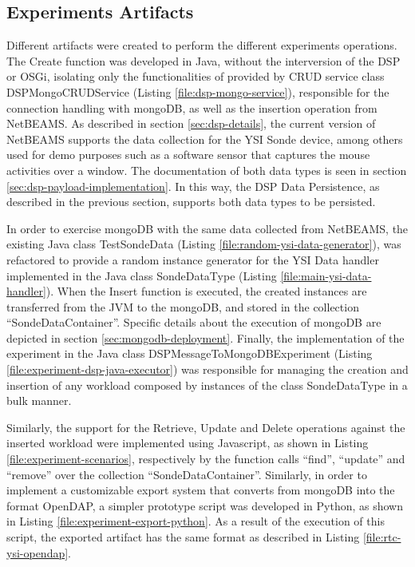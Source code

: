 \subsection{Experiments Artifacts}

Different artifacts were created to perform the different experiments
operations. The Create function was developed in Java, without the interversion
of the DSP or OSGi, isolating only the functionalities of provided by CRUD
service class DSPMongoCRUDService (Listing \ref{file:dsp-mongo-service}),
responsible for the connection handling with mongoDB, as well as the insertion
operation from NetBEAMS. As described in section \ref{sec:dsp-details}, the
current version of NetBEAMS supports the data collection for the YSI Sonde
device, among others used for demo purposes such as a software sensor that
captures the mouse activities over a window. The documentation of both data
types is seen in section \ref{sec:dsp-payload-implementation}. In this way, the
DSP Data Persistence, as described in the previous section, supports both data
types to be persisted.

In order to exercise mongoDB with the same data collected from NetBEAMS, the
existing Java class TestSondeData (Listing
\ref{file:random-ysi-data-generator}), was refactored to provide a random
instance generator for the YSI Data handler implemented in the Java class
SondeDataType (Listing \ref{file:main-ysi-data-handler}). When the Insert
function is executed, the created instances are transferred from the JVM to
the mongoDB, and stored in the collection ``SondeDataContainer''. Specific
details about the execution of mongoDB are depicted in section
\ref{sec:mongodb-deployment}. Finally, the implementation of the experiment
in the Java class DSPMessageToMongoDBExperiment (Listing
\ref{file:experiment-dsp-java-executor}) was responsible for managing the
creation and insertion of any workload composed by instances of the class
SondeDataType in a bulk manner.

Similarly, the support for the Retrieve, Update and Delete operations against
the inserted workload were implemented using Javascript, as shown in Listing
\ref{file:experiment-scenarios}, respectively by the function calls ``find'',
``update'' and ``remove'' over the collection ``SondeDataContainer''.
Similarly, in order to implement a customizable export system that converts
from mongoDB into the format OpenDAP, a simpler prototype script was developed
in Python, as shown in Listing \ref{file:experiment-export-python}. As a result
of the execution of this script, the exported artifact has the same format as
described in Listing \ref{file:rtc-ysi-opendap}. 


